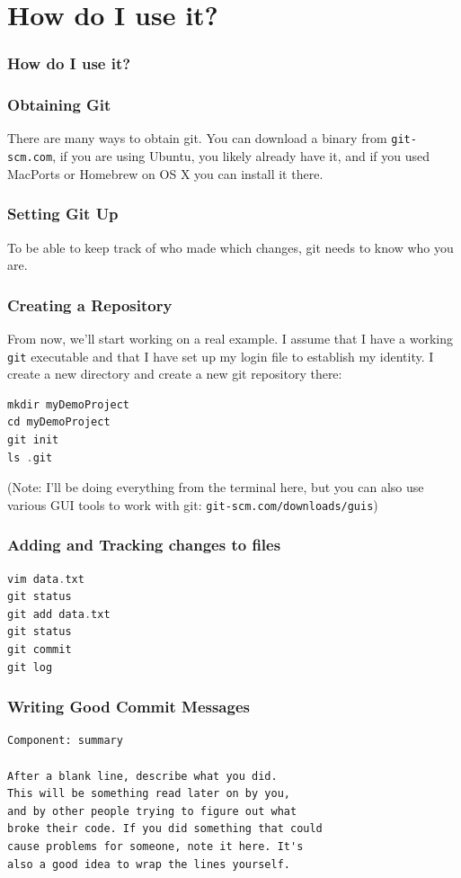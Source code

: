\documentclass{beamer}
\begin{document}
\section{How do I use it?}
\begin{frame}[fragile]
\frametitle{How do I use it?}

\end{frame}

\begin{frame}[fragile]
\frametitle{Obtaining Git}
There are many ways to obtain git. 
You can download a binary from \texttt{git-scm.com}, if you are using Ubuntu, you likely already have it, and if you used MacPorts or Homebrew on OS X you can install it there.
\end{frame}

\begin{frame}[fragile]
\frametitle{Setting Git Up}
To be able to keep track of who made which changes, git needs to know who you are.
\end{frame}

\begin{frame}[fragile]
\frametitle{Creating a Repository}
From now, we'll start working on a real example. I assume that I have a working \lstinline{git} executable and that I have set up my login file to establish my identity.
I create a new directory and create a new git repository there:
\begin{lstlisting}[language=C++]
mkdir myDemoProject
cd myDemoProject
git init
ls .git
\end{lstlisting}
\end{frame}
(Note: I'll be doing everything from the terminal here, but you can also use various GUI tools to work with git: \texttt{git-scm.com/downloads/guis})

\begin{frame}[fragile]
\frametitle{Adding and Tracking changes to files}
\begin{lstlisting}[language=C++]
vim data.txt
git status
git add data.txt
git status
git commit
git log
\end{lstlisting}
\end{frame}

\begin{frame}[fragile]
\frametitle{Writing Good Commit Messages}
\begin{verbatim}
Component: summary

After a blank line, describe what you did. 
This will be something read later on by you,
and by other people trying to figure out what
broke their code. If you did something that could 
cause problems for someone, note it here. It's
also a good idea to wrap the lines yourself.
\end{verbatim}
\end{frame}
\end{document}
